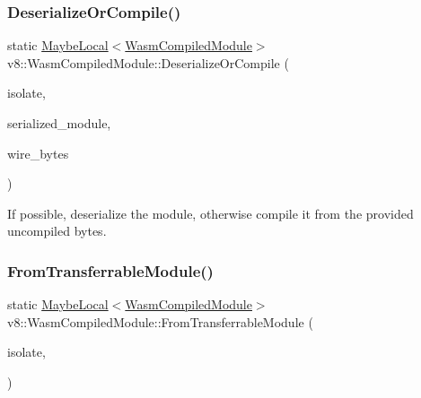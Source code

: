 \subsubsection{\texorpdfstring{Deserialize\+Or\+Compile()}{DeserializeOrCompile()}}
{\footnotesize\ttfamily static \mbox{\hyperlink{classv8_1_1MaybeLocal}{Maybe\+Local}}$<$\mbox{\hyperlink{classv8_1_1WasmCompiledModule}{Wasm\+Compiled\+Module}}$>$ v8\+::\+Wasm\+Compiled\+Module\+::\+Deserialize\+Or\+Compile (\begin{DoxyParamCaption}\item[{\mbox{\hyperlink{classv8_1_1Isolate}{Isolate}} $\ast$}]{isolate,  }\item[{\mbox{\hyperlink{structv8_1_1WasmCompiledModule_1_1BufferReference}{Buffer\+Reference}}}]{serialized\+\_\+module,  }\item[{\mbox{\hyperlink{structv8_1_1WasmCompiledModule_1_1BufferReference}{Buffer\+Reference}}}]{wire\+\_\+bytes }\end{DoxyParamCaption})\hspace{0.3cm}{\ttfamily [static]}}

If possible, deserialize the module, otherwise compile it from the provided uncompiled bytes. \mbox{\label{classv8_1_1WasmCompiledModule_a6bdfdf09e75ad1eb19d5b944e6177f74}} 
\subsubsection{\texorpdfstring{From\+Transferrable\+Module()}{FromTransferrableModule()}}
{\footnotesize\ttfamily static \mbox{\hyperlink{classv8_1_1MaybeLocal}{Maybe\+Local}}$<$\mbox{\hyperlink{classv8_1_1WasmCompiledModule}{Wasm\+Compiled\+Module}}$>$ v8\+::\+Wasm\+Compiled\+Module\+::\+From\+Transferrable\+Module (\begin{DoxyParamCaption}\item[{\mbox{\hyperlink{classv8_1_1Isolate}{Isolate}} $\ast$}]{isolate,  }\item[{const \mbox{\hyperlink{classv8_1_1WasmCompiledModule_1_1TransferrableModule}{Transferrable\+Module}} \&}]{ }\end{DoxyParamCaption})\hspace{0.3cm}{\ttfamily [static]}}

